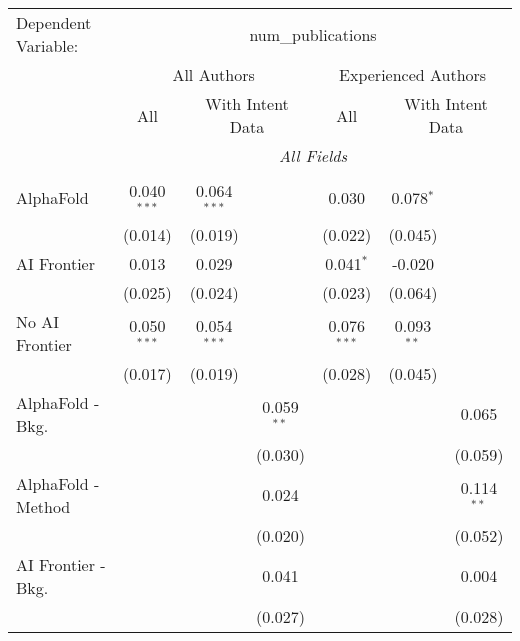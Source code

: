 \begingroup
\centering
\begin{tabular}{lcccccc}
   \tabularnewline \midrule \midrule
   Dependent Variable: & \multicolumn{6}{c}{num\_publications}\\
 & \multicolumn{3}{c}{All Authors} & \multicolumn{3}{c}{Experienced Authors} \\
\cmidrule(lr){2-4} \cmidrule(lr){5-7}
 & \multicolumn{1}{c}{All} & \multicolumn{2}{c}{With Intent Data} & \multicolumn{1}{c}{All} & \multicolumn{2}{c}{With Intent Data} \\
\cmidrule(lr){2-2} \cmidrule(lr){3-4} \cmidrule(lr){5-5} \cmidrule(lr){6-7}
 & \multicolumn{6}{c}{\textit{All Fields}} \\ \\
   AlphaFold               & 0.040$^{***}$ & 0.064$^{***}$ &               & 0.030         & 0.078$^{*}$  &   \\   
                           & (0.014)       & (0.019)       &               & (0.022)       & (0.045)      &   \\   
   AI Frontier             & 0.013         & 0.029         &               & 0.041$^{*}$   & -0.020       &   \\   
                           & (0.025)       & (0.024)       &               & (0.023)       & (0.064)      &   \\   
   No AI Frontier          & 0.050$^{***}$ & 0.054$^{***}$ &               & 0.076$^{***}$ & 0.093$^{**}$ &   \\   
                           & (0.017)       & (0.019)       &               & (0.028)       & (0.045)      &   \\   
   AlphaFold - Bkg.        &               &               & 0.059$^{**}$  &               &              & 0.065\\   
                           &               &               & (0.030)       &               &              & (0.059)\\   
   AlphaFold - Method      &               &               & 0.024         &               &              & 0.114$^{**}$\\   
                           &               &               & (0.020)       &               &              & (0.052)\\   
   AI Frontier - Bkg.      &               &               & 0.041         &               &              & 0.004\\   
                           &               &               & (0.027)       &               &              & (0.028)\\   

\end{tabular}
